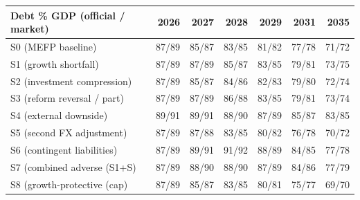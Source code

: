 \begin{tabular}{lrrrrrr}
\hline
Debt \% GDP (official / market) & 2026 & 2027 & 2028 & 2029 & 2031 & 2035\\ \hline
S0 (MEFP baseline) & 87/89 & 85/87 & 83/85 & 81/82 & 77/78 & 71/72\\
S1 (growth shortfall) & 87/89 & 87/89 & 85/87 & 83/85 & 79/81 & 73/75\\
S2 (investment compression) & 87/89 & 85/87 & 84/86 & 82/83 & 79/80 & 72/74\\
S3 (reform reversal / part) & 87/89 & 87/89 & 86/88 & 83/85 & 79/81 & 73/74\\
S4 (external downside) & 89/91 & 89/91 & 88/90 & 87/89 & 85/87 & 83/85\\
S5 (second FX adjustment) & 87/89 & 87/88 & 83/85 & 80/82 & 76/78 & 70/72\\
S6 (contingent liabilities) & 87/89 & 89/91 & 91/92 & 88/89 & 84/85 & 77/78\\
S7 (combined adverse (S1+S) & 87/89 & 88/90 & 88/90 & 87/89 & 84/86 & 77/79\\
S8 (growth-protective (cap) & 87/89 & 85/87 & 83/85 & 80/81 & 75/77 & 69/70\\
\hline
\end{tabular}
